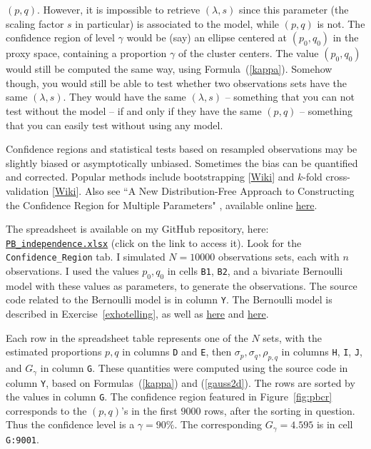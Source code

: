 \documentclass[10pt]{article}
\begin{document}
$(p,q)$. However, it is impossible to retrieve $(\lambda,s)$ since this parameter (the scaling factor $s$ in particular) is associated to the model, while $(p,q)$ is not. The confidence region of level $\gamma$ would be (say) an ellipse centered at $(p_0,q_0)$ in the proxy space, containing a proportion $\gamma$ of the cluster centers. The value $(p_0,q_0)$ would still be computed the same way, using Formula~(\ref{kappa}). Somehow though, you would still be able to test whether two observations sets have the same $(\lambda,s)$. They would have the same $(\lambda, s)$
 -- something that you can not test without the model -- if and only if they have the same $(p,q)$ -- something that you can easily test without using any model.

Confidence regions and statistical tests based on resampled observations may be slightly biased or asymptotically unbiased. Sometimes the bias can be quantified and corrected. Popular methods include
bootstrapping [\href{https://en.wikipedia.org/wiki/Bootstrapping_(statistics)}{Wiki}] and $k$-fold \textcolor{index}{cross-validation} [\href{https://en.wikipedia.org/wiki/Cross-validation_(statistics)}{Wiki}]. Also see ``A New Distribution-Free Approach to Constructing the Confidence Region for Multiple Parameters" \cite{crmodelfree},
available online \href{https://journals.plos.org/plosone/article?id=10.1371/journal.pone.0081179}{here}.
\quad \\


\noindent The spreadsheet is available on my GitHub repository, here: \href{https://github.com/VincentGranville/Point-Processes/tree/main/Spreadsheets}{\texttt{PB\_independence.xlsx}} (click on the link to access it).
Look for the
 \texttt{Confidence\_Region} tab. I simulated $N=\num{10000}$ observations sets, each with $n$ observations. I used the values
 $p_0, q_0$ in cells \texttt{B1}, \texttt{B2}, and a bivariate Bernoulli model with these values as parameters, to generate the observations. The source code related to the
Bernoulli model is in column \texttt{Y}.
The Bernoulli model is described
in Exercise~\ref{exhotelling}, as well as \href{https://stats.stackexchange.com/questions/564702/two-possible-definitions-of-confidence-regions-which-one-to-choose}{here}
and \href{https://www.datasciencecentral.com/model-free-inference-for-machine-learning-professionals/}{here}.

Each row in the spreadsheet table represents  one of the $N$ sets, with the estimated proportions $p,q$ in columns \texttt{D} and \texttt{E}, then
$\sigma_p,\sigma_q,\rho_{p,q}$ in columns \texttt{H}, \texttt{I}, \texttt{J}, and $G_\gamma$ in column \texttt{G}. These quantities were computed using the source code in column \texttt{Y}, based on Formulas~(\ref{kappa}) and (\ref{gauss2d}).
The rows are sorted by the values in column \texttt{G}.
 The confidence region featured in Figure~\ref{fig:pbcr} corresponds to the $(p,q)$'s in the first $\num{9000}$ rows, after the sorting in question. Thus  the confidence level is  a $\gamma=90\%$. The corresponding $G_\gamma=4.595$ is in cell \texttt{G:9001}.
\end{document}
